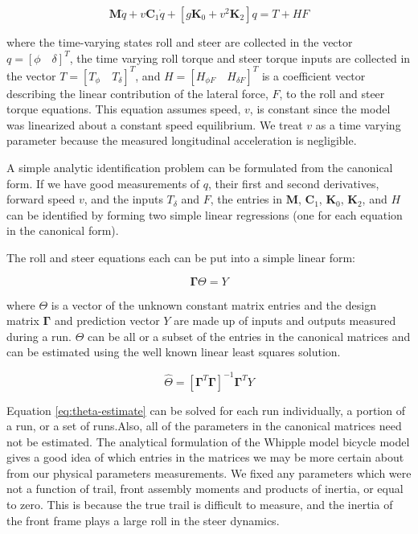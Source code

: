 \documentclass[a4paper]{article}
\begin{document}
\begin{equation}
  \mathbf{M} \ddot{q} + v \mathbf{C}_1 \dot{q} + [g \mathbf{K}_0 + v^2
  \mathbf{K}_2] q = T + H F
  \label{eq:canonical}
\end{equation}

where the time-varying states roll and steer are collected in the vector $q =
[\phi \quad \delta]^T$, the time varying  roll torque and steer torque inputs
are collected in the vector $T = [T_\phi \quad T_\delta]^T$, and $H = [H_{\phi
F} \quad H_{\delta F}]^T$ is a coefficient vector describing the linear contribution of the
lateral force, $F$, to the roll and steer torque equations. This equation
assumes  speed, $v$, is constant since the model was
linearized about a constant speed equilibrium. We treat $v$ as a time
varying parameter because the measured longitudinal acceleration is negligible.


A simple analytic identification problem can be formulated from the canonical
form. If we have good measurements of $q$, their first and second derivatives,
forward speed $v$, and the inputs $T_\delta$ and $F$, the entries in
$\mathbf{M}$, $\mathbf{C}_1$, $\mathbf{K}_0$, $\mathbf{K}_2$, and $H$ can be
identified by forming two simple linear regressions (one for each equation
in the canonical form).

The roll and steer equations each can be put into a simple linear form:

\begin{equation}
  \mathbf{\Gamma} \Theta = Y
\end{equation}

where $\Theta$ is a vector of the unknown constant matrix entries and the
design matrix $\mathbf{\Gamma}$ and  prediction vector $Y$ are made up
of inputs and outputs measured during a run. $\Theta$ can be all or a
subset of the entries in the canonical matrices and can be estimated using the
well known linear least squares solution.

\begin{equation}
  \hat{\Theta} = [\mathbf{\Gamma}^T \mathbf{\Gamma}]^{-1} \mathbf{\Gamma}^T Y
  \label{eq:theta-estimate}
\end{equation}

Equation \ref{eq:theta-estimate} can be solved for each run individually, a
portion of a run, or a set of runs.Also, all of the parameters in the canonical matrices need not be estimated.
The analytical formulation of the Whipple model bicycle model
\cite{Meijaard2007} gives a good idea of which entries in the matrices we may
be more certain about from our physical parameters measurements. We fixed any
parameters which were not a function of trail, front assembly moments and
products of inertia, or equal to zero. This is because the true trail is
difficult to measure, and the inertia of the front frame plays a large roll in the
steer dynamics.
\end{document}
